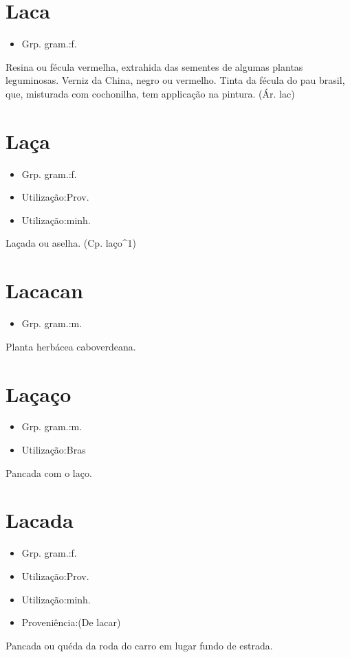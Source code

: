 \section{Laca}
\begin{itemize}
\item {Grp. gram.:f.}
\end{itemize}
Resina ou fécula vermelha, extrahida das sementes de algumas plantas leguminosas.
Verniz da China, negro ou vermelho.
Tinta da fécula do pau brasil, que, misturada com cochonilha, tem applicação na pintura.
(Ár. \textunderscore lac\textunderscore )
\section{Laça}
\begin{itemize}
\item {Grp. gram.:f.}
\end{itemize}
\begin{itemize}
\item {Utilização:Prov.}
\end{itemize}
\begin{itemize}
\item {Utilização:minh.}
\end{itemize}
Laçada ou aselha.
(Cp. \textunderscore laço\textunderscore ^1)
\section{Lacacan}
\begin{itemize}
\item {Grp. gram.:m.}
\end{itemize}
Planta herbácea caboverdeana.
\section{Laçaço}
\begin{itemize}
\item {Grp. gram.:m.}
\end{itemize}
\begin{itemize}
\item {Utilização:Bras}
\end{itemize}
Pancada com o laço.
\section{Lacada}
\begin{itemize}
\item {Grp. gram.:f.}
\end{itemize}
\begin{itemize}
\item {Utilização:Prov.}
\end{itemize}
\begin{itemize}
\item {Utilização:minh.}
\end{itemize}
\begin{itemize}
\item {Proveniência:(De \textunderscore lacar\textunderscore )}
\end{itemize}
Pancada ou quéda da roda do carro em lugar fundo de estrada.
